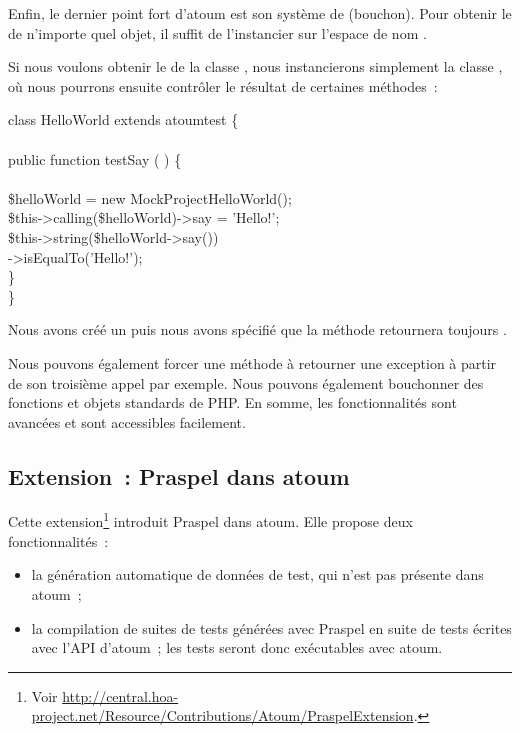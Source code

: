 Enfin, le dernier point fort d'atoum est son système de 
(bouchon). Pour obtenir le  de n'importe quel objet, il suffit
de l'instancier sur l'espace de nom .

\begin{example}

Si nous voulons obtenir le  de la classe
, nous instancierons simplement la classe
, où nous pourrons ensuite
contrôler le résultat de certaines méthodes~:
%
\begin{pre}
class HelloWorld extends \bslash{}atoum\bslash{}test \{ \\
 \\
    public function testSay ( ) \{ \\
 \\
        \$helloWorld = new \bslash{}Mock\bslash{}Project\bslash{}HelloWorld(); \\
        \$this->calling(\$helloWorld)->say = 'Hello!'; \\
        \$this->string(\$helloWorld->say()) \\
                  ->isEqualTo('Hello!'); \\
    \} \\
\}
\end{pre}
%
Nous avons créé un  puis nous avons spécifié que la méthode
 retournera toujours .

\end{example}

Nous pouvons également forcer une méthode à retourner une exception à partir de
son troisième appel par exemple. Nous pouvons également bouchonner des fonctions
et objets standards de PHP. En somme, les fonctionnalités sont avancées et sont
accessibles facilement.

\subsection{Extension~: Praspel dans atoum}
\label{subsection:tools:extension}

Cette extension\footnote{Voir
\url{http://central.hoa-project.net/Resource/Contributions/Atoum/PraspelExtension}.}
introduit Praspel dans atoum. Elle propose deux fonctionnalités~:
%
\begin{itemize}

\item la génération automatique de données de test, qui n'est pas présente dans
atoum~;

\item la compilation de suites de tests générées avec Praspel en suite de tests
écrites avec l'API d'atoum~; les tests seront donc exécutables avec atoum.

\end{itemize}

